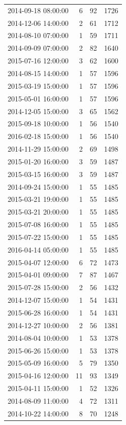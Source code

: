 \begin{tabular}{lrrr}
2014-09-18 08:00:00 & 6 & 92 & 1726 \\
2014-12-06 14:00:00 & 2 & 61 & 1712 \\
2014-08-10 07:00:00 & 1 & 59 & 1711 \\
2014-09-09 07:00:00 & 2 & 82 & 1640 \\
2015-07-16 12:00:00 & 3 & 62 & 1600 \\
2014-08-15 14:00:00 & 1 & 57 & 1596 \\
2015-03-19 15:00:00 & 1 & 57 & 1596 \\
2015-05-01 16:00:00 & 1 & 57 & 1596 \\
2014-12-05 15:00:00 & 3 & 65 & 1562 \\
2015-09-18 10:00:00 & 1 & 56 & 1540 \\
2016-02-18 15:00:00 & 1 & 56 & 1540 \\
2014-11-29 15:00:00 & 2 & 69 & 1498 \\
2015-01-20 16:00:00 & 3 & 59 & 1487 \\
2015-03-15 16:00:00 & 3 & 59 & 1487 \\
2014-09-24 15:00:00 & 1 & 55 & 1485 \\
2015-03-21 19:00:00 & 1 & 55 & 1485 \\
2015-03-21 20:00:00 & 1 & 55 & 1485 \\
2015-07-08 16:00:00 & 1 & 55 & 1485 \\
2015-07-22 15:00:00 & 1 & 55 & 1485 \\
2016-04-14 05:00:00 & 1 & 55 & 1485 \\
2015-04-07 12:00:00 & 6 & 72 & 1473 \\
2015-04-01 09:00:00 & 7 & 87 & 1467 \\
2015-07-28 15:00:00 & 2 & 56 & 1432 \\
2014-12-07 15:00:00 & 1 & 54 & 1431 \\
2015-06-28 16:00:00 & 1 & 54 & 1431 \\
2014-12-27 10:00:00 & 2 & 56 & 1381 \\
2014-08-04 10:00:00 & 1 & 53 & 1378 \\
2015-06-26 15:00:00 & 1 & 53 & 1378 \\
2015-05-09 16:00:00 & 5 & 79 & 1350 \\
2015-04-16 12:00:00 & 11 & 93 & 1349 \\
2015-04-11 15:00:00 & 1 & 52 & 1326 \\
2014-08-09 11:00:00 & 4 & 72 & 1311 \\
2014-10-22 14:00:00 & 8 & 70 & 1248 \\

\end{tabular}
